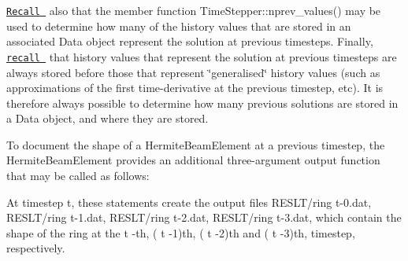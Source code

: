 \href{../../../unsteady_heat/two_d_unsteady_heat/html/index.html#IC}{\tt Recall } also that the member function {\ttfamily Time\+Stepper\+::nprev\+\_\+values()} may be used to determine how many of the history values that are stored in an associated {\ttfamily Data} object represent the solution at previous timesteps. Finally, \href{../../../unsteady_heat/two_d_unsteady_heat/html/index.html#IC}{\tt recall } that history values that represent the solution at previous timesteps are always stored before those that represent \char`\"{}generalised\char`\"{} history values (such as approximations of the first time-\/derivative at the previous timestep, etc). It is therefore always possible to determine how many previous solutions are stored in a {\ttfamily Data} object, and where they are stored.

To document the shape of a {\ttfamily Hermite\+Beam\+Element} at a previous timestep, the {\ttfamily Hermite\+Beam\+Element} provides an additional three-\/argument output function that may be called as follows\+:




At timestep {\ttfamily t}, these statements create the output files {\ttfamily R\+E\+S\+L\+T/ring} t{\ttfamily -\/0{\ttfamily }.dat}, {\ttfamily R\+E\+S\+L\+T/ring} t{\ttfamily -\/1{\ttfamily }.dat}, {\ttfamily R\+E\+S\+L\+T/ring} t{\ttfamily -\/2{\ttfamily }.dat}, {\ttfamily R\+E\+S\+L\+T/ring} t{\ttfamily -\/3{\ttfamily }.dat}, which contain the shape of the ring at the {\ttfamily t} -\/th, ( {\ttfamily t} -\/1)th, ( {\ttfamily t} -\/2)th and ( {\ttfamily t} -\/3)th, timestep, respectively.

